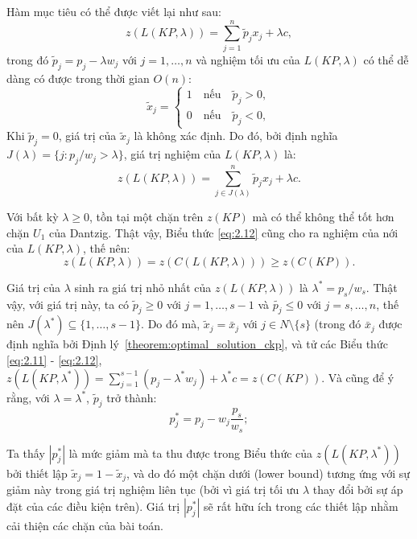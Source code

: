 Hàm mục tiêu có thể được viết lại như sau:
\begin{equation}
    \label{eq:2.11}
    z(L(KP, \lambda)) = \sum_{j = 1}^n\widetilde{p}_jx_j + \lambda c, 
\end{equation}
trong đó $\widetilde{p}_j = p_j - \lambda w_j$ với $j = 1, \dots, n$ và nghiệm tối ưu của $L(KP, \lambda)$ có thể dễ dàng có được trong thời gian $O(n)$:
\begin{equation}
    \label{eq:2.12}
    \widetilde{x}_j = \begin{cases}
        1\quad\text{nếu}\quad \widetilde{p}_j > 0,\\
        0\quad\text{nếu}\quad \widetilde{p}_j < 0,
    \end{cases}
\end{equation}
Khi $\widetilde{p}_j = 0$, giá trị của $\widetilde{x}_j$ là không xác định. Do đó, bởi định nghĩa $J(\lambda) = \{j : p_j / w_j > \lambda \}$, giá trị nghiệm của $L(KP, \lambda)$ là:
\begin{equation}
    z(L(KP, \lambda)) = \sum_{j \in J(\lambda)}^n\widetilde{p}_jx_j + \lambda c.
\end{equation}

Với bất kỳ $\lambda \geq 0$, tồn tại một chặn trên $z(KP)$ mà có thể không thể tốt hơn chặn $U_1$ của Dantzig. Thật vậy, Biểu thức \eqref{eq:2.12} cũng cho ra nghiệm của nới  của $L(KP, \lambda)$, thế nên:
\begin{equation}
    z(L(KP, \lambda)) = z(C(L(KP, \lambda))) \geq z(C(KP)).
\end{equation}

Giá trị của $\lambda$ sinh ra giá trị nhỏ nhất của $z(L(KP, \lambda))$ là $\lambda^* = p_s / w_s$. Thật vậy, với giá trị này, ta có $\widetilde{p}_j \geq 0$ với $j = 1, \dots, s - 1$ và $\widetilde{p_j}\leq 0$ với $j = s, \dots, n$, thế nên $J(\lambda^*) \subseteq \{1, \dots, s - 1\}$. Do đó mà, $\widetilde{x}_j = \bar{x}_j$ với $j \in N \setminus \{s\}$ (trong đó $\bar{x}_j$ được định nghĩa bởi Định lý~\ref{theorem:optimal_solution_ckp}, và tử các Biểu thức \eqref{eq:2.11} - \eqref{eq:2.12}, $z(L(KP, \lambda^*)) = \sum_{j=1}^{s-1}(p_j - \lambda^*w_j) + \lambda^*c = z(C(KP))$. Và cũng để ý rằng, với $\lambda = \lambda^*$, $\widetilde{p}_j$ trở thành:
\begin{equation}
    \label{eq:2.13}
    p_{j}^* = p_j - w_j \frac{p_s}{w_s};
\end{equation}

Ta thấy $|p_{j}^* |$ là mức giảm mà ta thu được trong Biểu thức của $z(L(KP, \lambda^*))$ bởi thiết lập $\widetilde{x}_j = 1 - \widetilde{x}_j$, và do đó một chặn dưới (lower bound) tương ứng với sự giảm này trong giá trị nghiệm liên tục (bởi vì giá trị tối ưu $\lambda$ thay đổi bởi sự áp đặt của các điều kiện trên). Giá trị $|p_{j}^* |$ sẽ rất hữu ích trong các thiết lập nhằm cải thiện các chặn của bài toán.

